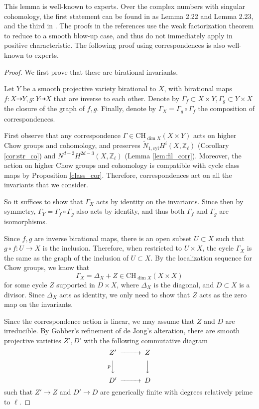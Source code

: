 \documentclass{amsart}
\theoremstyle{definition}
\theoremstyle{remark}
\newcommand{\mbb}{\mathbb}
\newcommand{\ZZ}{\mbb{Z}}
\newcommand{\cyl}{\text{cyl}}
\begin{document}
    
This lemma is well-known to experts. Over the complex numbers with singular cohomology, the first statement can be found in \cite{Voisin_SB_Survey} as Lemma 2.22 and Lemma 2.23, and the third in \cite[Proposition 1.4]{VoisinConiveau}. The proofs in the references use the weak factorization theorem to reduce to a smooth blow-up case, and thus do not immediately apply in positive characteristic.
The following proof using correspondences is also well-known to experts. 
\begin{proof}
    We first prove that these are birational invariants.
    
    Let $Y$ be a smooth projective variety birational to $X$, with birational maps $f:X \dashrightarrow Y, g: Y \dashrightarrow X$ that are inverse to each other. Denote by $\Gamma_f \subset X \times Y, \Gamma_g \subset Y \times X$ the closure of the graph of $f, g$. Finally, denote by $\Gamma_X=\Gamma_g \circ \Gamma_f$ the composition of correspondences.
    
    First observe that any correspondence $\Gamma \in \text{CH}_{\dim X}(X \times Y)$ acts on higher Chow groups and cohomology, and preserves $\tilde{N}_{1, \cyl}H^i(X, \ZZ_\ell)$ (Corollary \ref{cor:str_co}) and ${N}^{d-2}H^{2d-3}(X, \ZZ_\ell)$ (Lemma \ref{lem:fil_corr}). 
     Moreover, the action on higher Chow groups and cohomology is compatible with cycle class maps by Proposition \ref{class_cor}.
     Therefore, correspondences act on all the invariants that we consider.
     
    So it suffices to show that $\Gamma_X$ acts by identity on the invariants. Since then by symmetry, $\Gamma_Y=\Gamma_f \circ \Gamma_g$ also acts by identity, and thus both $\Gamma_f$ and $\Gamma_g$ are isomorphisms.
    
    Since $f, g$ are inverse birational maps, there is an open subset $U \subset X$ such that $g\circ f: U \to X$ is the inclusion. Therefore, when restricted to $U \times X$, the cycle $\Gamma_X$ is the same as the graph of the inclusion of $U \subset X$. By the localization sequence for Chow groups, we know that 
    \[
    \Gamma_X=\Delta_X+Z \in \text{CH}_{\dim X}(X\times X)
    \]
    for some cycle $Z$ supported in $D \times X$, where $\Delta_X$ is the diagonal, and $D\subset X$ is a divisor.
    Since $\Delta_X$ acts as identity, we only need to show that $Z$ acts as the zero map on the invariants.

    Since the correspondence action is linear, we may assume that $Z$ and $D$ are irreducible. By Gabber's refinement of de Jong's alteration, there are smooth projective varieties $Z', D'$ with the following commutative diagram
    \[
    \begin{CD}
    Z'@>>>Z\\
    @V p VV @VVV\\
    D'@>>>D\\
    \end{CD}
    \]
    such that $Z' \to Z$ and $D' \to D$ are generically finite with degrees relatively prime to $\ell$. 
    

\end{proof}
\end{document}
